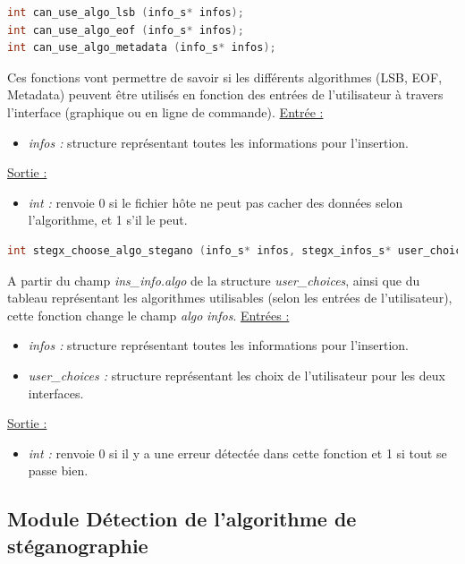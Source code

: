 \documentclass[11pt]{article}
\begin{document}
\begin{lstlisting}[language=c]
int can_use_algo_lsb (info_s* infos);
int can_use_algo_eof (info_s* infos);
int can_use_algo_metadata (info_s* infos);
\end{lstlisting}

Ces fonctions vont permettre de savoir si les différents algorithmes 
(LSB, EOF, Metadata) peuvent être utilisés en fonction des entrées 
de l'utilisateur à travers l'interface (graphique ou en ligne de commande). 
\newline
\underline{Entrée :} 
\begin{itemize}
\item \textit{infos :} structure représentant toutes les informations pour 
l'insertion.  
\end{itemize}
\underline{Sortie :} 
\begin{itemize}
\item \textit{int :} renvoie 0 si le fichier hôte ne peut pas cacher des 
données selon l'algorithme, et 1 s'il le peut. 
\newline 
\end{itemize}

\begin{lstlisting}[language=c]
int stegx_choose_algo_stegano (info_s* infos, stegx_infos_s* user_choices); 
\end{lstlisting}

A partir du champ \textit{ins\_info.algo} de la structure \textit{user\_choices}, 
ainsi que du tableau représentant les algorithmes utilisables (selon les 
entrées de l'utilisateur), cette fonction change le champ \textit{algo} 
\textit{infos}. 
\newline
\underline{Entrées :} 
\begin{itemize}
\item \textit{infos :} structure représentant toutes les informations pour 
l'insertion.  
\item \textit{user\_choices :} structure représentant les choix de 
l'utilisateur pour les deux interfaces. 
\end{itemize}
\underline{Sortie :} 
\begin{itemize}
\item \textit{int :} renvoie 0 si il y a une erreur détectée dans cette 
fonction et 1 si tout se passe bien.  
\newline 
\end{itemize}

\subsection{Module Détection de l'algorithme de
stéganographie}
\end{document}
